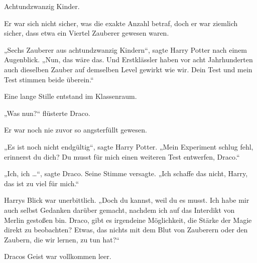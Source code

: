 Achtundzwanzig Kinder.

Er war sich nicht sicher, was die exakte Anzahl betraf, doch er war ziemlich sicher, dass etwa ein Viertel Zauberer gewesen waren.

„Sechs Zauberer aus achtundzwanzig Kindern“, sagte Harry Potter nach einem Augenblick.
„Nun, das wäre das. Und Erstklässler haben vor acht Jahrhunderten auch dieselben Zauber auf demselben Level gewirkt wie wir. Dein Test und mein Test stimmen beide überein.“

Eine lange Stille entstand im Klassenraum.

„Was nun?“ flüsterte Draco.

Er war noch nie zuvor so angsterfüllt gewesen.

„Es ist noch nicht endgültig“, sagte Harry Potter.
„Mein Experiment schlug fehl, erinnerst du dich? Du musst für mich einen weiteren Test entwerfen, Draco.“

„Ich, ich …“, sagte Draco. Seine Stimme versagte.
„Ich schaffe das nicht, Harry, das ist zu viel für mich.“

Harrys Blick war unerbittlich.
„Doch du kannst, weil du es musst. Ich habe mir auch selbst Gedanken darüber gemacht, nachdem ich auf das Interdikt von Merlin gestoßen bin. Draco, gibt es irgendeine Möglichkeit, die Stärke der Magie direkt zu beobachten? Etwas, das nichts mit dem Blut von Zauberern oder den Zaubern, die wir lernen, zu tun hat?“

Dracos Geist war vollkommen leer.


